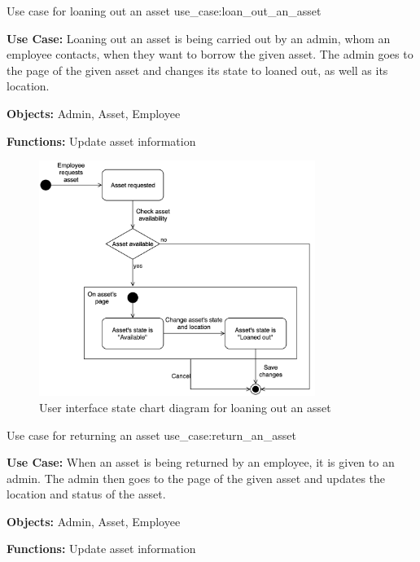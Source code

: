 \newpage

    {Use case for loaning out an asset}
    {use_case:loan_out_an_asset}
    {
        \textbf{Use Case:} Loaning out an asset is being carried out by an admin, whom an employee contacts, when they want to borrow the given asset. The admin goes to the page of the given asset and changes its state to loaned out, as well as its location.
    
        \vskip 0.2cm
        
        \textbf{Objects:} Admin, Asset, Employee
        
        \vskip 0.2cm
        
        \textbf{Functions:} Update asset information
    }
 
\begin{figure}[H]
    \centering
    \includegraphics[width=0.8\textwidth]{figures/UC_Loan_out_asset.png}
    \caption{User interface state chart diagram for loaning out an asset}
    \label{fig:loan_out_asse_statechart}
\end{figure}
 
 \newpage
 
    {Use case for returning an asset}
    {use_case:return_an_asset}
    {
        \textbf{Use Case:} When an asset is being returned by an employee, it is given to an admin. The admin then goes to the page of the given asset and updates the location and status of the asset.
    
        \vskip 0.2cm
        
        \textbf{Objects:} Admin, Asset, Employee
        
        \vskip 0.2cm
        
        \textbf{Functions:} Update asset information
    }
    
